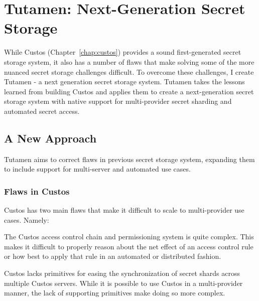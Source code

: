 \chapter{Tutamen: Next-Generation Secret Storage}
\label{chap:tutamen}

While Custos (Chapter~\ref{chap:custos}) provides a sound
first-generated secret storage system, it also has a number of flaws
that make solving some of the more nuanced secret storage challenges
difficult. To overcome these challenges, I create Tutamen - a next
generation secret storage system. Tutamen takes the lessons learned
from building Custos and applies them to create a next-generation
secret storage system with native support for multi-provider secret
sharding and automated secret access.

\section{A New Approach}
\label{chap:tutamen:new}

Tutamen aims to correct flaws in previous secret storage system,
expanding them to include support for multi-server and automated use
cases.

\subsection{Flaws in Custos}

Custos has two main flaws that make it difficult to scale to
multi-provider use cases. Namely:

\begin{packed_item}
\item The Custos access control chain and permissioning system is
  quite complex. This makes it difficult to properly reason about the
  net effect of an access control rule or how best to apply that rule
  in an automated or distributed fashion.
\item Custos lacks primitives for easing the synchronization of secret
  shards across multiple Custos servers. While it is possible to use
  Custos in a multi-provider manner, the lack of supporting primitives
  make doing so more complex.
\end{packed_item}

